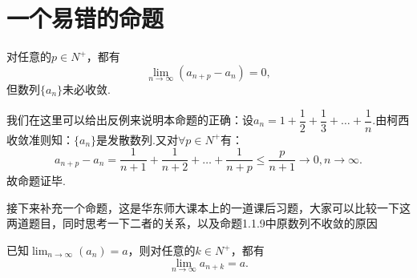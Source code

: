 \section{一个易错的命题}

\begin{proposition}
	对任意的$p\in N^+$，都有
	\[\displaystyle\lim_{n\to\infty}(a_{n+p}-a_n)=0,\]
	但数列$\{a_n\}$未必收敛.
\end{proposition}

\begin{example}
	我们在这里可以给出反例来说明本命题的正确：设$a_n=1+\dfrac{1}{2}+\dfrac{1}{3}+\dots+\dfrac{1}{n}.$由柯西收敛准则知：$\{a_n\}$是发散数列.又对$\forall p\in N^+$有：
	\[a_{n+p}-a_n=\dfrac{1}{n+1}+\dfrac{1}{n+2}+\dots+\dfrac{1}{n+p}\leq\dfrac{p}{n+1}\rightarrow 0,n\rightarrow\infty.\]
	故命题证毕.
\end{example}

接下来补充一个命题，这是华东师大课本上的一道课后习题，大家可以比较一下这两道题目，同时思考一下二者的关系，以及命题1.1.9中原数列不收敛的原因

\begin{proposition}
	已知$\displaystyle\lim_{n\to\infty}(a_n)=a$，则对任意的$k\in N^+$，都有
	\begin{equation}
		\displaystyle\lim_{n\to\infty}a_{n+k}=a.
	\end{equation}
\end{proposition}